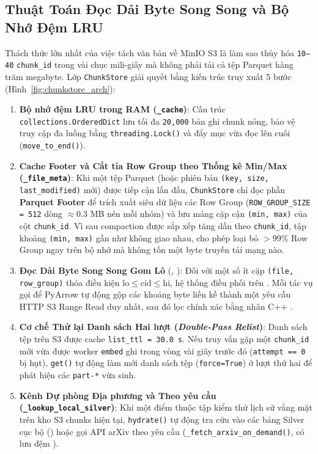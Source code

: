 

\subsection{Thuật Toán Đọc Dải Byte Song Song và Bộ Nhớ Đệm LRU}
\label{sec:ch2_byte_range}

Thách thức lớn nhất của việc tách văn bản về MinIO S3 là làm sao thủy hóa \texttt{10--40} \texttt{chunk\_id} trong vài chục mili-giây mà không phải tải cả tệp Parquet hàng trăm megabyte. Lớp \texttt{ChunkStore} giải quyết bằng kiến trúc truy xuất 5 bước (Hình~\ref{fig:chunkstore_arch}):
\begin{enumerate}[label=\textbf{\arabic*.}]
  \item \textbf{Bộ nhớ đệm LRU trong RAM (\texttt{\_cache})}: Cấu trúc \texttt{collections.OrderedDict} lưu tối đa \texttt{20,000} bản ghi chunk nóng, bảo vệ truy cập đa luồng bằng \texttt{threading.Lock()} và đẩy mục vừa đọc lên cuối (\texttt{move\_to\_end()}).
  \item \textbf{Cache Footer và Cắt tỉa Row Group theo Thống kê Min/Max (\texttt{\_file\_meta})}: Khi một tệp Parquet (hoặc phiên bản \texttt{(key, size, last\_modified)} mới) được tiếp cận lần đầu, \texttt{ChunkStore} chỉ đọc phần \textbf{Parquet Footer} để trích xuất siêu dữ liệu các Row Group (\texttt{ROW\_GROUP\_SIZE = 512} dòng $\approx 0.3\text{ MB}$ nén mỗi nhóm) và lưu mảng cặp cận \texttt{(min, max)} của cột \texttt{chunk\_id}. Vì  sau compaction được sắp xếp tăng dần theo \texttt{chunk\_id}, tập khoảng \texttt{(min, max)} gần như không giao nhau, cho phép loại bỏ $>99\%$ Row Group ngay trên bộ nhớ mà không tốn một byte truyền tải mạng nào.
  \item \textbf{Đọc Dải Byte Song Song Gom Lô} (, ): Đối với một số ít cặp \texttt{(file, row\_group)} thỏa điều kiện $\text{lo} \le \text{cid} \le \text{hi}$, hệ thống điều phối trên . Mỗi tác vụ gọi  để PyArrow tự động gộp các khoảng byte liền kề thành một yêu cầu HTTP S3 Range Read duy nhất, sau đó lọc chính xác bằng nhân C++ .
  \item \textbf{Cơ chế Thử lại Danh sách Hai lượt (\textit{Double-Pass Relist})}: Danh sách tệp trên S3 được cache \texttt{list\_ttl = 30.0 s}. Nếu truy vấn gặp một \texttt{chunk\_id} mới vừa được worker \texttt{embed} ghi trong vòng vài giây trước đó (\texttt{attempt == 0} bị hụt), \texttt{get()} tự động làm mới danh sách tệp (\texttt{force=True}) ở lượt thứ hai để phát hiện các \texttt{part-*} vừa sinh.
  \item \textbf{Kênh Dự phòng Địa phương và Theo yêu cầu (\texttt{\_lookup\_local\_silver})}: Khi một điểm thuộc tập kiểm thử lịch sử vắng mặt trên kho S3 chunks hiện tại, \texttt{hydrate()} tự động tra cứu vào các bảng Silver cục bộ () hoặc gọi API arXiv theo yêu cầu (\texttt{\_fetch\_arxiv\_on\_demand()}, có lưu đệm ).
\end{enumerate}

